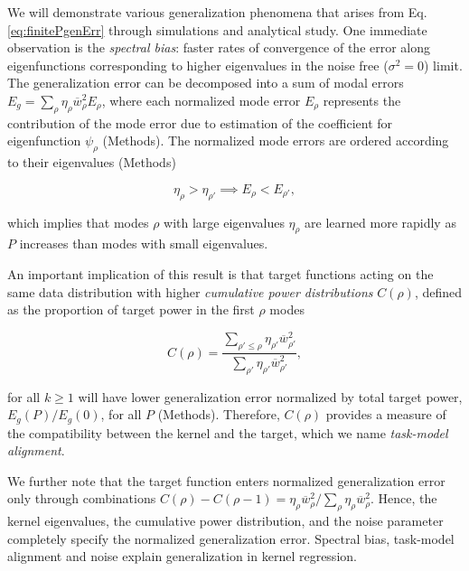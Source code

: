 \documentclass[11pt]{article}
\begin{document}
We will demonstrate various generalization phenomena that arises from Eq. \eqref{eq:finitePgenErr} through simulations and analytical study. One immediate observation is the \textit{spectral bias}: faster rates of convergence of the error along eigenfunctions corresponding to higher eigenvalues in the noise free ($\sigma^2 = 0$) limit. The generalization error can be decomposed into a sum of modal errors $ E_g = \sum_\rho \eta_\rho \overline{w}_{\rho}^2 E_\rho$, where each normalized mode error $E_\rho$ represents the contribution of the mode error due to estimation of the coefficient for eigenfunction $\psi_\rho$ (Methods). The normalized mode errors are ordered according to their eigenvalues (Methods)
\begin{linenomath*}\begin{equation}
    \eta_\rho > \eta_{\rho'} \implies E_{\rho} < E_{\rho'},
\end{equation}\end{linenomath*}
which implies that modes $\rho$ with large eigenvalues $\eta_\rho$ are learned more rapidly as $P$ increases than modes with small eigenvalues. 

An important implication of this result is that target functions acting on the same data distribution with higher \textit{cumulative power distributions} $C(\rho)$, defined as the proportion of target power in the first $\rho$ modes
\begin{linenomath*}
\begin{equation}\label{eq:Ck}
    C(\rho) = \frac{\sum_{\rho' \leq \rho} \eta_{\rho'} \overline{w}_{\rho'}^2}{\sum_{\rho'} \eta_{\rho'} \overline{w}_{\rho'}^2},
\end{equation}
\end{linenomath*}
for all $k\geq 1$ will have lower generalization error normalized by total target power, $E_g(P)/E_g(0)$, for all $P$ (Methods). Therefore, $C(\rho)$ provides a measure of the compatibility between the kernel and the target, which we name {\it task-model alignment}. 

We further note that the target function enters normalized generalization error only through combinations $C(\rho)-C(\rho-1) = \eta_{\rho} \overline{w}_{\rho}^2/\sum_{\rho} \eta_\rho \overline{w}_\rho^2$. Hence, the kernel eigenvalues, the cumulative power distribution, and the noise parameter completely specify the normalized generalization error. Spectral bias, task-model alignment and noise explain generalization in kernel regression.
\end{document}
